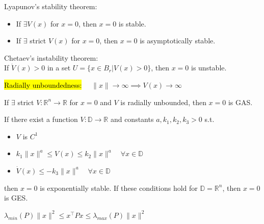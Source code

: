 \begin{tcolorbox}[colback=white, colframe=teal]
\begin{theorem}
    Lyapunov's stability theorem:
    \begin{itemize}[topsep=0pt]
        \item If $\exists V(x)$ for $x=0$, then $x=0$ is stable.
        \item If $\exists$ strict $V(x)$ for $x=0$, then $x=0$ is asymptotically stable.
    \end{itemize}
\end{theorem}
\end{tcolorbox}

\begin{theorem}
    Chetaev's instability theorem:\\
    If $\dot{V}(x) > 0$ in a set $U = \{x \in B_r | V(x) > 0\}$, then $x=0$ is unstable.
\end{theorem}

\begin{definition}
    \hl{Radially unboundedness:} $\quad \| x\| \rightarrow \infty \implies V(x) \rightarrow \infty$
\end{definition}

\begin{theorem}
    If $\exists$ strict  $V : \mathbb{R}^n \rightarrow \mathbb{R}$ for $x=0$ and
    $V$ is radially unbounded,
    then $x=0$ is GAS.
\end{theorem}

\begin{theorem}
    If there exist a function $V : \mathbb{D} \rightarrow \mathbb{R}$ and constants $a, k_1, k_2, k_3 > 0$ s.t.
    \begin{itemize}[topsep=0pt]
        \item $V$ is $C^1$
        \item $k_{1}\|x\|^{a} \leq V(x) \leq k_{2}\|x\|^{a} \quad \forall x \in \mathbb{D}$
        \item $\dot{V}(x) \leq-k_{3}\|x\|^{a} \quad \forall x \in \mathbb{D}$
    \end{itemize}
    then $x=0$ is exponentially stable. If these conditions hold for $\mathbb{D} = \mathbb{R}^n$, then $x=0$ is GES. 
\end{theorem}

\begin{remark}
    $\lambda_{min}(P) \|x\|^2 \leq x^{\top} P x \leq \lambda_{max}(P) \|x\|^2$
\end{remark}

